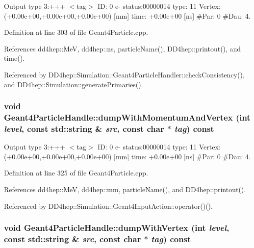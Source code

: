 Output type 3:+++ $<$tag$>$ ID: 0 e-\/ status:00000014 type: 11 Vertex:(+0.00e+00,+0.00e+00,+0.00e+00) \mbox{[}mm\mbox{]} time: +0.00e+00 \mbox{[}ns\mbox{]} \#Par: 0 \#Dau: 4. 

Definition at line 303 of file Geant4Particle.cpp.

References dd4hep::MeV, dd4hep::ns, particleName(), DD4hep::printout(), and time().

Referenced by DD4hep::Simulation::Geant4ParticleHandler::checkConsistency(), and DD4hep::Simulation::generatePrimaries().\hypertarget{class_d_d4hep_1_1_simulation_1_1_geant4_particle_handle_aa4264b3e5c3a6bf6577aa76e6a8bbb5b}{
\subsubsection[{dumpWithMomentumAndVertex}]{\setlength{\rightskip}{0pt plus 5cm}void Geant4ParticleHandle::dumpWithMomentumAndVertex (int {\em level}, \/  const std::string \& {\em src}, \/  const char $\ast$ {\em tag}) const}}
\label{class_d_d4hep_1_1_simulation_1_1_geant4_particle_handle_aa4264b3e5c3a6bf6577aa76e6a8bbb5b}


Output type 3:+++ $<$tag$>$ ID: 0 e-\/ status:00000014 type: 11 Vertex:(+0.00e+00,+0.00e+00,+0.00e+00) \mbox{[}mm\mbox{]} time: +0.00e+00 \mbox{[}ns\mbox{]} \#Par: 0 \#Dau: 4. 

Definition at line 325 of file Geant4Particle.cpp.

References dd4hep::MeV, dd4hep::mm, particleName(), and DD4hep::printout().

Referenced by DD4hep::Simulation::Geant4InputAction::operator()().\hypertarget{class_d_d4hep_1_1_simulation_1_1_geant4_particle_handle_ad71c2d2b9411f02726842af3cf566486}{
\subsubsection[{dumpWithVertex}]{\setlength{\rightskip}{0pt plus 5cm}void Geant4ParticleHandle::dumpWithVertex (int {\em level}, \/  const std::string \& {\em src}, \/  const char $\ast$ {\em tag}) const}}
\label{class_d_d4hep_1_1_simulation_1_1_geant4_particle_handle_ad71c2d2b9411f02726842af3cf566486}


